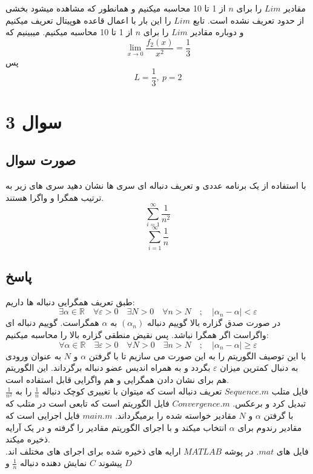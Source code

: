 \documentclass[12pt, letterpaper]{article}
\begin{document}
\vspace{5 mm}
مقادیر 
\(Lim\)
 را برای 
\(n\)
 از 1 تا 10 محاسبه میکنیم و همانطور که مشاهده میشود بخشی از حدود تعریف نشده است.
تابع \(Lim\) را این بار با اعمال قاعده هوپیتال تعریف میکنیم و دوباره مقادیر \(Lim\) را برای \(n\) از 1 تا 10 محاسبه میکنیم. میبینیم که
\[ \lim_{x\to 0}\frac {f_2(x)}{x^2} = \frac{1}{3}\]
پس 
\[ L = \frac{1}{3}, \: p = 2\]


\section{سوال 3}
\subsection{صورت سوال}
با استفاده از یک برنامه عددی و تعریف دنباله ای سری ها نشان دهید سری های زیر به ترتیب همگرا و واگرا هستند.
\[ \sum_{i=1}^{\infty} \frac {1}{n^2}\]
\[ \sum_{i=1}^{\infty} \frac {1}{n}\]



\subsection{پاسخ}

طبق تعریف همگرایی دنباله ها داریم:
\[\exists \! \alpha\! \in\! \mathbb{R} \quad \forall \varepsilon \! > \! 0 \quad \exists N\! > \! 0 \quad \forall n\! >\! N\quad ; \quad \big| \alpha_{n} - \alpha \big|\! <\! \varepsilon \]
در صورت صدق گزاره بالا گوییم دنباله 
\((\alpha_{n})\)
به 
$\alpha$
همگراست. گوییم دنباله ای واگراست اگر همگرا نباشد. پس نقیض منطقی گزاره بالا را محاسبه میکنیم:
\[\forall \! \alpha\! \in\! \mathbb{R} \quad \exists \varepsilon \! > \! 0 \quad \forall N\! > \! 0 \quad \exists n\! >\! N\quad ; \quad \big| \alpha_{n} - \alpha \big|\! \ge\! \varepsilon \]
با این توصیف الگوریتم را به این صورت می سازیم تا با گرفتن 
$\alpha$
 و 
$N$
به عنوان ورودی به دنبال کمترین میزان 
$\varepsilon$
 بگردد و به همراه اندیس عضو دنباله برگرداند. این الگوریتم هم برای نشان دادن همگرایی و هم واگرایی قابل استفاده است.
\\
فایل متلب 
$Sequence.m$
تعریف دنباله است که میتوان با تغییری کوچک دنباله 
$\frac{1}{n}$
را به 
$\frac{1}{n^2}$
 تبدیل کرد و برعکس. 
$Convergence.m$
فایل الگوریتم است که تابعی است در متلب که با گرفتن 
$\alpha$ 
 و 
$N$
مقادیر خواسته شده را برمیگرداند.
$main.m$
 فایل اجرایی است که مقادیر رندوم برای 
$\alpha$
 انتخاب میکند و با اجرای الگوریتم مقادیر را گرفته و در یک آرایه ذخیره میکند.
\\
 فایل های 
$.mat$
در پوشه 
$MATLAB$
 ارایه های ذخیره شده برای اجرای های مختلف اند. پیشوند 
$C$
 نمایش دهنده دنباله 
$\frac{1}{n}$ و $D$
 
\end{document}
